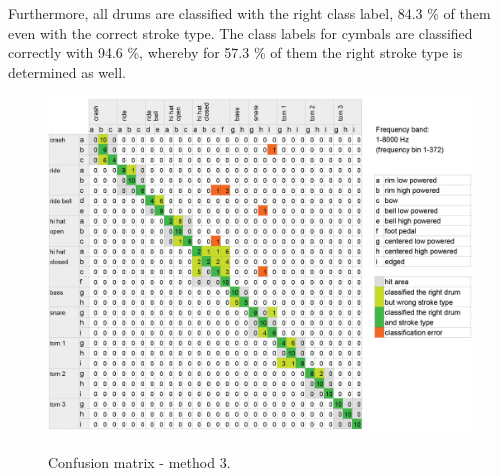 Furthermore, all drums are classified with the right class label, 84.3 \% of them even with the correct stroke type. The class labels for cymbals are classified correctly with 94.6 \%, whereby for 57.3 \% of them the right stroke type is determined as well.






\begin{figure}[htb]
	\centering
	\includegraphics[width=\textwidth]{images/classification_matrix/matrix_test_3.png}
	\label{}
	\caption{Confusion matrix - method 3.}
	\label{fig:matrix3}
\end{figure}

%

